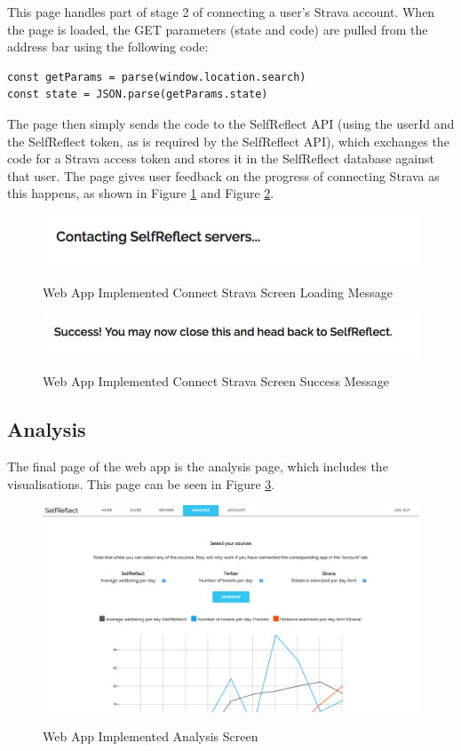 \documentclass[11pt,openright,a4paper]{report}
\begin{document}
This page handles part of stage 2 of connecting a user's Strava account. When the page is loaded, the GET parameters (state and code) are pulled from the address bar using the following code:
\begin{lstlisting}
const getParams = parse(window.location.search)
const state = JSON.parse(getParams.state)
\end{lstlisting}

The page then simply sends the code to the SelfReflect API (using the userId and the SelfReflect token, as is required by the SelfReflect API), which exchanges the code for a Strava access token and stores it in the SelfReflect database against that user. The page gives user feedback on the progress of connecting Strava as this happens, as shown in Figure \ref{fig:webstravaloading} and Figure \ref{fig:webstravasuccess}.

\begin{figure}[ht]
\centering
\caption{Web App Implemented Connect Strava Screen Loading Message}
\includegraphics[width=.75\textwidth]{i/webstravaloading.png}
\label{fig:webstravaloading}
\end{figure}

\begin{figure}[ht]
\centering
\caption{Web App Implemented Connect Strava Screen Success Message}
\includegraphics[width=.75\textwidth]{i/webstravasuccess.png}
\label{fig:webstravasuccess}
\end{figure}

\subsection{Analysis}
The final page of the web app is the analysis page, which includes the visualisations. This page can be seen in Figure \ref{fig:webanalysisimpl}.

\begin{figure}[ht]
\centering
\caption{Web App Implemented Analysis Screen}
\includegraphics[width=.75\textwidth]{i/webanalysisimpl.png}
\label{fig:webanalysisimpl}
\end{figure}
\end{document}
